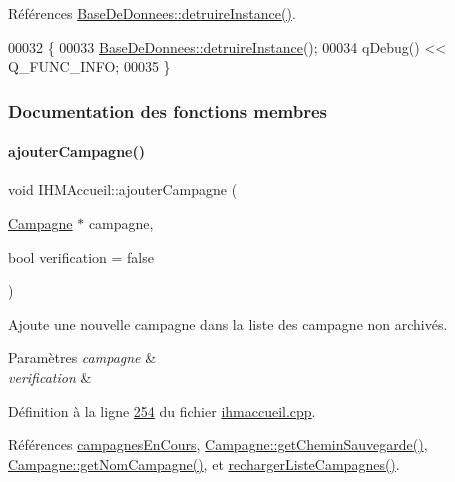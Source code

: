 Références \hyperlink{basededonnees_8cpp_source_l00044}{Base\+De\+Donnees\+::detruire\+Instance()}.


\begin{DoxyCode}
00032 \{
00033     \hyperlink{class_base_de_donnees_a457401c0816b888c77ce915997545f4e}{BaseDeDonnees::detruireInstance}();
00034     qDebug() << Q\_FUNC\_INFO;
00035 \}
\end{DoxyCode}


\subsubsection{Documentation des fonctions membres}
\mbox{\label{class_i_h_m_accueil_a3087ce7a78561c79ce3148761750dd1d}} 
\paragraph{\texorpdfstring{ajouter\+Campagne()}{ajouterCampagne()}}
{\footnotesize\ttfamily void I\+H\+M\+Accueil\+::ajouter\+Campagne (\begin{DoxyParamCaption}\item[{\hyperlink{class_campagne}{Campagne} $\ast$}]{campagne,  }\item[{bool}]{verification = {\ttfamily false} }\end{DoxyParamCaption})}



Ajoute une nouvelle campagne dans la liste des campagne non archivés. 


\begin{DoxyParams}{Paramètres}
{\em campagne} & \\
\hline
{\em verification} & \\
\hline
\end{DoxyParams}


Définition à la ligne \hyperlink{ihmaccueil_8cpp_source_l00254}{254} du fichier \hyperlink{ihmaccueil_8cpp_source}{ihmaccueil.\+cpp}.



Références \hyperlink{ihmaccueil_8h_source_l00039}{campagnes\+En\+Cours}, \hyperlink{campagne_8cpp_source_l00055}{Campagne\+::get\+Chemin\+Sauvegarde()}, \hyperlink{campagne_8cpp_source_l00019}{Campagne\+::get\+Nom\+Campagne()}, et \hyperlink{ihmaccueil_8cpp_source_l00092}{recharger\+Liste\+Campagnes()}.



